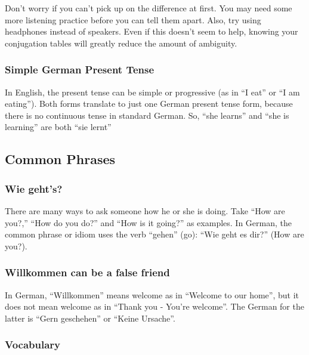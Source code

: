 Don't worry if you can't pick up on the difference at first. You may need some more listening practice before you can tell them apart. Also, try using headphones instead of speakers.  Even if this doesn't seem to help, knowing your conjugation tables will greatly reduce the amount of ambiguity.

\subsubsection{Simple German Present Tense}

In English, the present tense can be simple or progressive (as in ``I eat'' or ``I am eating''). Both forms translate to just one German present tense form, because there is no continuous tense in standard German. So, ``she learns'' and ``she is learning'' are both ``sie lernt''


\pagebreak
\subsection{Common Phrases}

\subsubsection{Wie geht's?}

There are many ways to ask someone how he or she is doing. Take ``How are you?,'' ``How do you do?'' and ``How is it going?'' as examples. In German, the common phrase or idiom uses the verb ``gehen'' (go): ``Wie geht es dir?'' (How are you?).

\subsubsection{Willkommen can be a false friend}

In German, ``Willkommen'' means welcome as in ``Welcome to our home'', but it does not mean welcome as in ``Thank you - You're welcome''. The German for the latter is ``Gern geschehen'' or ``Keine Ursache''.

\subsubsection{Vocabulary}

